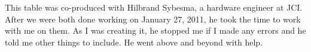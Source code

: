 This table was co-produced with Hilbrand Sybesma, a hardware engineer at JCI. After we were both done working on January 27, 2011, he took the time to work with me on them. As I was creating it, he stopped me if I made any errors and he told me other things to include. He went above and beyond with help.